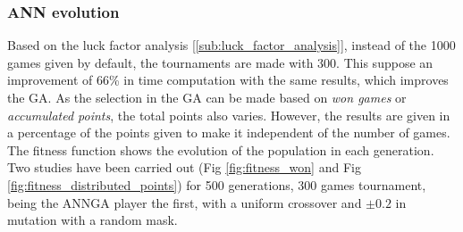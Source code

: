 		\subsubsection{ANN evolution} %
		\label{ssub:ann_evolution}
		Based on the luck factor analysis [\ref{sub:luck_factor_analysis}], instead of the 1000 games given by default, the tournaments are made with 300. 
		This suppose an improvement of 66\% in time computation with the same results, which improves the GA.
		As the selection in the GA can be made based on \emph{won games} or \emph{accumulated points}, the total points also varies.
		However, the results are given in a percentage of the points given to make it independent of the number of games.
		The fitness function shows the evolution of the population in each generation. \\

		Two studies have been carried out (Fig \ref{fig:fitness_won} and Fig \ref{fig:fitness_distributed_points}) for 500 generations, 300 games tournament, being the ANNGA player the first, with a uniform crossover and $\pm 0.2$ in mutation with a random mask. \\


